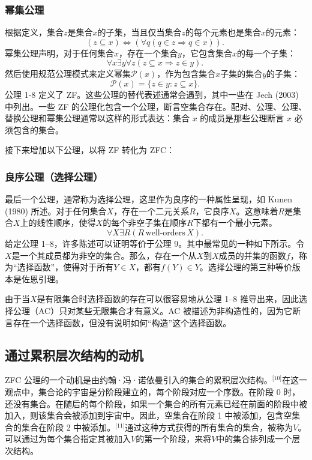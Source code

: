 \subsubsection{幂集公理} 
根据定义，集合\( z \)是集合\( x \)的子集，当且仅当集合\( z \)的每个元素也是集合\( x \)的元素：
\[
(z \subseteq x) \Leftrightarrow (\forall q (q \in z \Rightarrow q \in x)).~
\]
幂集公理声明，对于任何集合\( x \)，存在一个集合\( y \)，它包含集合\( x \)的每一个子集：
\[
\forall x \exists y \forall z (z \subseteq x \Rightarrow z \in y).~
\]
然后使用规范公理模式来定义幂集\( \mathcal{P}(x) \)，作为包含集合\( x \)子集的集合\( y \)的子集：
\[
\mathcal{P}(x) = \{ z \in y : z \subseteq x \}.~
\]
公理 1-8 定义了 ZF。这些公理的替代表述通常会遇到，其中一些在 Jech (2003) 中列出。一些 ZF 的公理化包含一个公理，断言空集合存在。配对、公理、公理、替换公理和幂集公理通常以这样的形式表达：集合 \( x \) 的成员是那些公理断言 \( x \) 必须包含的集合。

接下来增加以下公理，以将 ZF 转化为 ZFC：
\subsubsection{良序公理（选择公理）} 
最后一个公理，通常称为选择公理，这里作为良序的一种属性呈现，如 Kunen (1980) 所述。对于任何集合\( X \)，存在一个二元关系\( R \)，它良序\( X \)。这意味着\( R \)是集合\( X \)上的线性顺序，使得\( X \)的每个非空子集在顺序\( R \)下都有一个最小元素。
\[
\forall X \exists R (R \, \text{well-orders} \, X).~
\]
给定公理 1–8，许多陈述可以证明等价于公理 9。其中最常见的一种如下所示。令\( X \)是一个其成员都为非空的集合。那么，存在一个从\( X \)到\( X \)成员的并集的函数\( f \)，称为“选择函数”，使得对于所有\( Y \in X \)，都有\( f(Y) \in Y \)。选择公理的第三种等价版本是佐恩引理。

由于当\( X \)是有限集合时选择函数的存在可以很容易地从公理 1–8 推导出来，因此选择公理（AC）只对某些无限集合才有意义。AC 被描述为非构造性的，因为它断言存在一个选择函数，但没有说明如何“构造”这个选择函数。
\subsection{通过累积层次结构的动机}  
ZFC 公理的一个动机是由约翰·冯·诺依曼引入的集合的累积层次结构。\(^\text{[10]}\)在这一观点中，集合论的宇宙是分阶段建立的，每个阶段对应一个序数。在阶段 0 时，还没有集合。在随后的每个阶段，如果一个集合的所有元素已经在前面的阶段中被加入，则该集合会被添加到宇宙中。因此，空集合在阶段 1 中被添加，包含空集合的集合在阶段 2 中被添加。\(^\text{[11]}\)通过这种方式获得的所有集合的集合，被称为\( V \)。可以通过为每个集合指定其被加入\( V \)的第一个阶段，来将\( V \)中的集合排列成一个层次结构。

